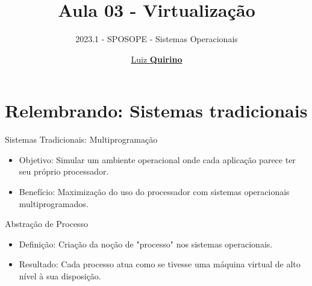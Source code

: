 \documentclass{beamer}
\title{Aula 03 - Virtualização}
\subtitle{2023.1 - SPOSOPE - Sistemas Operacionais}
\author{\href{mailto:luizfpq@gmail.com}{Luiz \textbf{Quirino}}}
\newcommand{\hrefcol}[2]{\textcolor{cyan}{\href{#1}{#2}}}
\begin{document}
\maketitle
{}
%
%




\section{Relembrando: Sistemas tradicionais}
\begin{frame}{Sistemas Tradicionais: Multiprogramação}
    \begin{itemize}
        \item Objetivo: Simular um ambiente operacional onde cada aplicação parece ter seu próprio processador.
        \item Benefício: Maximização do uso do processador com sistemas operacionais multiprogramados.
    \end{itemize}
    \end{frame}
    
    \begin{frame}{Abstração de Processo}
    \begin{itemize}
        \item Definição: Criação da noção de "processo" nos sistemas operacionais.
        \item Resultado: Cada processo atua como se tivesse uma máquina virtual de alto nível à sua disposição.
    \end{itemize}
    \end{frame}
    
\end{document}
